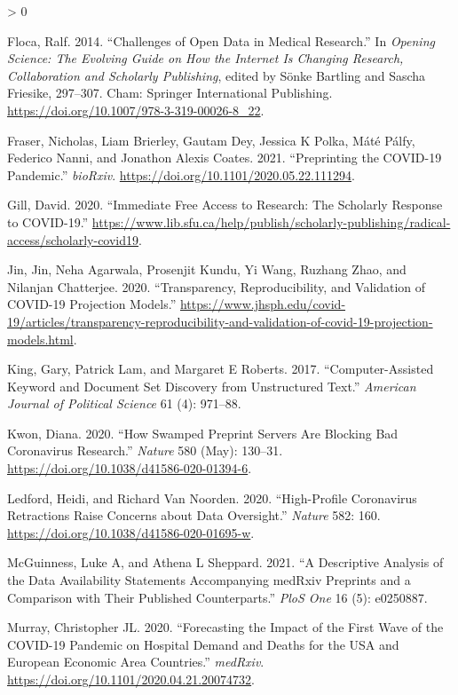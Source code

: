 \documentclass[
]{article}
\newlength{\cslhangindent}
\newenvironment{CSLReferences}[2] %
 {%
  \setlength{\parindent}{0pt}
  \ifodd #1 \everypar{\setlength{\hangindent}{\cslhangindent}}\ignorespaces\fi
  \ifnum #2 > 0
  \setlength{\parskip}{#2\baselineskip}
  \fi
 }%
 {}
\begin{document}
\begin{CSLReferences}{1}{0}
\leavevmode\hypertarget{ref-Floca2014}{}%
Floca, Ralf. 2014. {``Challenges of Open Data in Medical Research.''} In \emph{Opening Science: The Evolving Guide on How the Internet Is Changing Research, Collaboration and Scholarly Publishing}, edited by Sönke Bartling and Sascha Friesike, 297--307. Cham: Springer International Publishing. \url{https://doi.org/10.1007/978-3-319-00026-8_22}.

\leavevmode\hypertarget{ref-citeFraser}{}%
Fraser, Nicholas, Liam Brierley, Gautam Dey, Jessica K Polka, Máté Pálfy, Federico Nanni, and Jonathon Alexis Coates. 2021. {``Preprinting the COVID-19 Pandemic.''} \emph{bioRxiv}. \url{https://doi.org/10.1101/2020.05.22.111294}.

\leavevmode\hypertarget{ref-gill2020}{}%
Gill, David. 2020. {``Immediate Free Access to Research: The Scholarly Response to COVID-19.''} \url{https://www.lib.sfu.ca/help/publish/scholarly-publishing/radical-access/scholarly-covid19}.

\leavevmode\hypertarget{ref-jin2020}{}%
Jin, Jin, Neha Agarwala, Prosenjit Kundu, Yi Wang, Ruzhang Zhao, and Nilanjan Chatterjee. 2020. {``Transparency, Reproducibility, and Validation of COVID-19 Projection Models.''} \url{https://www.jhsph.edu/covid-19/articles/transparency-reproducibility-and-validation-of-covid-19-projection-models.html}.

\leavevmode\hypertarget{ref-king2017computer}{}%
King, Gary, Patrick Lam, and Margaret E Roberts. 2017. {``Computer-Assisted Keyword and Document Set Discovery from Unstructured Text.''} \emph{American Journal of Political Science} 61 (4): 971--88.

\leavevmode\hypertarget{ref-kwon2020}{}%
Kwon, Diana. 2020. {``How Swamped Preprint Servers Are Blocking Bad Coronavirus Research.''} \emph{Nature} 580 (May): 130--31. \url{https://doi.org/10.1038/d41586-020-01394-6}.

\leavevmode\hypertarget{ref-ledford2020}{}%
Ledford, Heidi, and Richard Van Noorden. 2020. {``High-Profile Coronavirus Retractions Raise Concerns about Data Oversight.''} \emph{Nature} 582: 160. \url{https://doi.org/10.1038/d41586-020-01695-w}.

\leavevmode\hypertarget{ref-mcguinness2021descriptive}{}%
McGuinness, Luke A, and Athena L Sheppard. 2021. {``A Descriptive Analysis of the Data Availability Statements Accompanying medRxiv Preprints and a Comparison with Their Published Counterparts.''} \emph{PloS One} 16 (5): e0250887.

\leavevmode\hypertarget{ref-murray2020}{}%
Murray, Christopher JL. 2020. {``Forecasting the Impact of the First Wave of the COVID-19 Pandemic on Hospital Demand and Deaths for the USA and European Economic Area Countries.''} \emph{medRxiv}. \url{https://doi.org/10.1101/2020.04.21.20074732}.


\end{CSLReferences}
\end{document}
